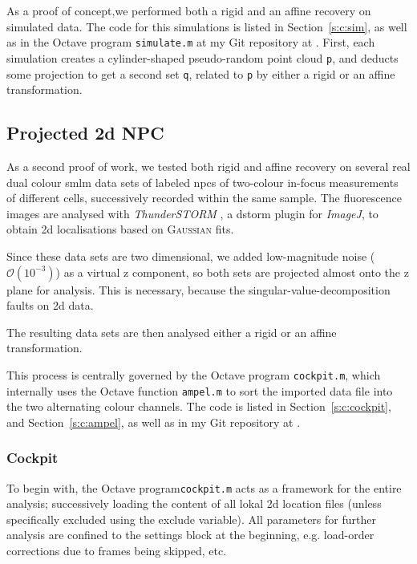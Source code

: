 \documentclass[11pt, a4paper, oneside, twocolumn]{report}
\renewcommand{\tt}{\texttt}
\newcommand{\e}{\emph}
\newcommand{\x}[1]{#1\index{#1}}
\begin{document}
As a proof of concept,we performed both a rigid and an affine recovery
on simulated data. The code for this simulations is listed in
Section~\ref{s:c:sim}, as well as in the \x{Octave} program
\tt{simulate.m} at my Git repository at \cite{sie21}. First, each
simulation creates a cylinder-shaped pseudo-random point cloud \tt{p},
and deducts some projection to get a second set \tt{q}, related to
\tt{p} by either a rigid or an affine transformation.


\subsection{Projected 2d NPC}\label{s:m:2dsmlm}

As a second proof of work, we tested both rigid and affine recovery on
several real dual colour \gls{smlm} data sets of labeled \gls{npc}s of
two-colour in-focus measurements of different cells, successively
recorded within the same sample. The fluorescence images are analysed
with \e{\x{ThunderSTORM}} \cite{omk14}, a \gls{dstorm} plugin for
\e{\x{ImageJ}}, to obtain 2d localisations based on \textsc{Gaussian}
fits.

Since these data sets are two dimensional, we added low-magnitude
noise ($\mathcal{O}(10^{-3})$) as a virtual z component, so both sets
are projected almost onto the z plane for analysis. This is necessary,
because the singular-value-decomposition faults on 2d data.

The resulting data sets are then analysed either a rigid or an affine
transformation.

This process is centrally governed by the Octave program
\tt{cockpit.m}, which internally uses the Octave function \tt{ampel.m}
to sort the imported data file into the two alternating colour
channels. The code is listed in Section~\ref{s:c:cockpit}, and
Section~\ref{s:c:ampel}, as well as in my Git repository at
\cite{sie21}.


\subsubsection{Cockpit}
  
To begin with, the Octave program\tt{cockpit.m} acts as a framework
for the entire analysis; successively loading the content of all lokal
2d location files (unless specifically excluded using the exclude
variable). All parameters for further analysis are confined to the
settings block at the beginning, e.g. load-order corrections due to
frames being skipped, etc.
\end{document}
